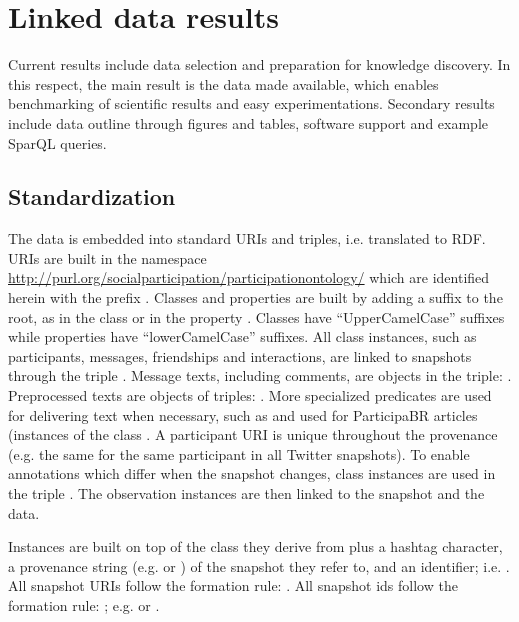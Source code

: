 \section{Linked data results}
\label{outline}
Current results include data selection and preparation for knowledge discovery.
In this respect, the main result is the data made available, which enables benchmarking of scientific results
and easy experimentations.
Secondary results include data outline through figures and tables,
software support and example SparQL queries.

\subsection{Standardization}
The data is embedded into standard URIs and triples, i.e. translated to RDF.
URIs are built in the namespace \url{http://purl.org/socialparticipation/participationontology/}
which are identified herein with the prefix .
Classes and properties are built by adding a suffix to the root,
as in the class  or in the property .
Classes have ``UpperCamelCase'' suffixes while properties have ``lowerCamelCase'' suffixes.
All class instances, such as participants, messages, friendships and
interactions, are linked to
snapshots through the triple .
Message texts, including comments, are objects in the triple: .
Preprocessed texts are objects of triples: .
More specialized predicates are used for delivering text when necessary,
such as  and  used
for ParticipaBR articles (instances of the class .
A participant URI is unique throughout the provenance (e.g. the same for
the same participant in all Twitter snapshots).
To enable annotations which differ when the snapshot changes,
 class instances are used in the triple
.
The observation instances are then linked to the snapshot and the
data.

Instances are built on top of the class they derive from plus a hashtag character,
a provenance string (e.g.  or
) of the snapshot they refer to, and an identifier;
i.e. .
All snapshot URIs follow the formation rule: .
All snapshot ids follow the formation rule: ; e.g.
 or
.

